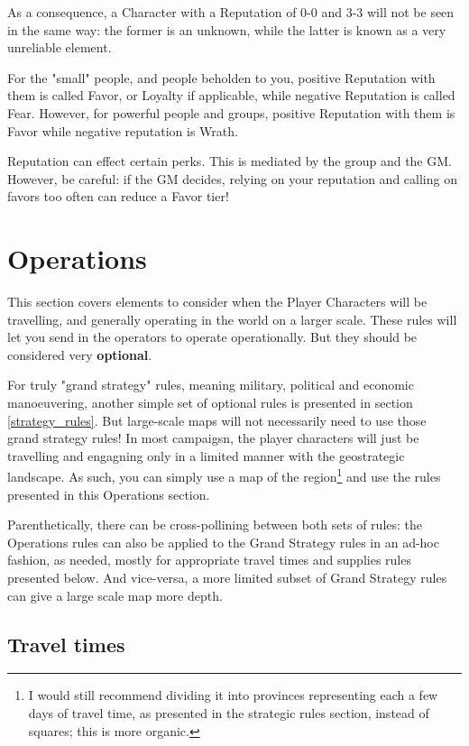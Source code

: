 As a consequence, a Character with a Reputation of 0-0 and 3-3 will not be seen in the same way: the former is an unknown, while the latter is known as a very unreliable element.

For the "small" people, and people beholden to you, positive Reputation with them is called Favor, or Loyalty if applicable, while negative Reputation is called Fear. However, for powerful people and groups, positive Reputation with them is Favor while negative reputation is Wrath.

Reputation can effect certain perks. This is mediated by the group and the GM. However, be careful: if the GM decides, relying on your reputation and calling on favors too often can reduce a Favor tier!



\section{Operations}
\label{operations}

This section covers elements to consider when the Player Characters will be travelling, and generally operating in the world on a larger scale. These rules will let you send in the operators to operate operationally. But they should be considered very \textbf{optional}.

For truly "grand strategy" rules, meaning military, political and economic manoeuvering, another simple set of optional rules is presented in section \ref{strategy_rules}. But large-scale maps will not necessarily need to use those grand strategy rules! In most campaigsn, the player characters will just be travelling and engagning only in a limited manner with the geostrategic landscape. As such, you can simply use a map of the region\footnote{I would still recommend dividing it into provinces representing each a few days of travel time, as presented in the strategic rules section, instead of squares; this is more organic.} and use the rules presented in this Operations section.

Parenthetically, there can be cross-pollining between both sets of rules: the Operations rules can also be applied to the Grand Strategy rules in an ad-hoc fashion, as needed, mostly for appropriate travel times and supplies rules presented below. And vice-versa, a more limited subset of Grand Strategy rules can give a large scale map more depth.


\subsection{Travel times}

